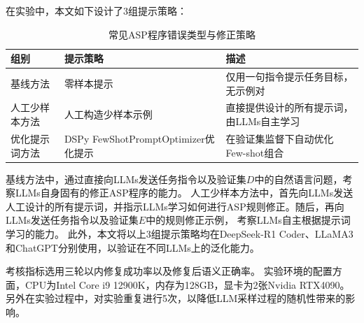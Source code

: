 在实验中，本文如下设计了3组提示策略：
\begin{table}[H]
\centering
\caption{常见ASP程序错误类型与修正策略}
\begin{tabular}{|l|p{5.5cm}|p{5.5cm}|}
\hline
\textbf{组别} & \textbf{提示策略} & \textbf{描述} \\
\hline
基线方法 & 零样本提示 & 仅用一句指令提示任务目标，无示例对 \\
\hline
人工少样本方法 & 人工构造少样本示例 & 直接提供设计的所有提示词，由LLMs自主学习 \\
\hline
优化提示词方法 & DSPy FewShotPromptOptimizer优化提示 & 在验证集监督下自动优化Few-shot组合 \\
\hline
\end{tabular}
\end{table}
基线方法中，通过直接向LLMs发送任务指令以及验证集$D$中的自然语言问题，考察LLMs自身固有的修正ASP程序的能力。
人工少样本方法中，首先向LLMs发送人工设计的所有提示词，并指示LLMs学习如何进行ASP规则修正。随后，再向LLMs发送任务指令以及验证集$E$中的规则修正示例，
考察LLMs自主根据提示词学习的能力。
此外，本文将以上3组提示策略均在DeepSeek-R1 Coder、LLaMA3和ChatGPT分别使用，以验证在不同LLMs上的泛化能力。

考核指标选用三轮以内修复成功率以及修复后语义正确率。
实验环境的配置方面，CPU为Intel Core i9 12900K，内存为128GB，显卡为2张Nvidia RTX4090。
另外在实验过程中，对实验重复进行5次，以降低LLM采样过程的随机性带来的影响。

